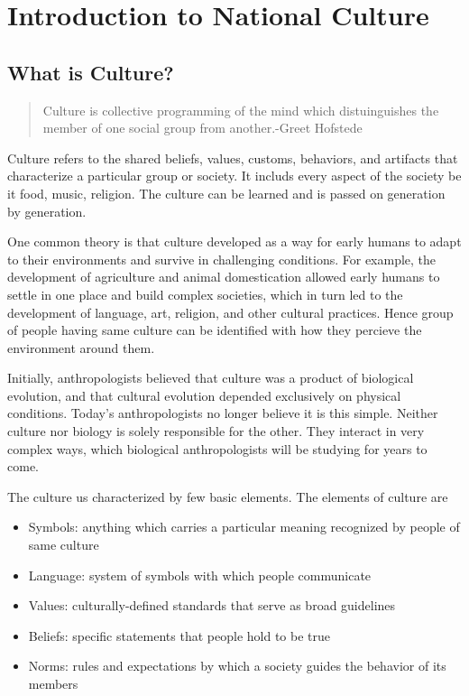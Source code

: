 \documentclass{article}
\begin{document}
\newpage
\tableofcontents
\newpage
\listoffigures
\newpage
\listoftables

\newpage
\section{Introduction to National Culture}
\subsection{What is Culture?}
\begin{quote}
    Culture is collective programming of the mind which distuinguishes the member of one social group from another.\hfill -Greet Hofstede
\end{quote}

Culture refers to the shared beliefs, values, customs, behaviors, and artifacts that characterize a particular group or society. It includs every aspect of the society be it food, music, religion. The culture can be learned and is passed on generation by generation.

One common theory is that culture developed as a way for early humans to adapt to their environments and survive in challenging conditions. For example, the development of agriculture and animal domestication allowed early humans to settle in one place and build complex societies, which in turn led to the development of language, art, religion, and other cultural practices. Hence group of people having same culture can be identified with how they percieve the environment around them.

Initially, anthropologists believed that culture was a product of biological evolution, and that cultural evolution depended exclusively on physical conditions. Today’s anthropologists no longer believe it is this simple. Neither culture nor biology is solely responsible for the other. They interact in very complex ways, which biological anthropologists will be studying for years to come.

The culture us characterized by few basic elements. The elements of culture are
\begin{itemize}
    \item Symbols: anything which carries a particular meaning recognized by people of same culture
    \item Language: system of symbols with which people communicate
    \item Values: culturally-defined standards that serve as broad guidelines
    \item Beliefs: specific statements that people hold to be true
    \item Norms: rules and expectations by which a society guides the behavior of its members
\end{itemize}
\end{document}
